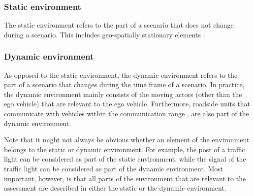 
\subsubsection{Static environment}
\label{sec:static environment}
The static environment refers to the part of a scenario that does not change during a scenario. This includes geo-spatially stationary elements \cite{ulbrich2015}. 

\subsubsection{Dynamic environment}
\label{sec:dynamic environment}
As opposed to the static environment, the dynamic environment refers to the part of a scenario that changes during the time frame of a scenario. 
In practice, the dynamic environment mainly consists of the moving actors (other than the ego vehicle) that are relevant to the ego vehicle. 
Furthermore, roadside units that communicate with vehicles within the communication range \cite{alsultan2014comprehensive}, are also part of the dynamic environment.

Note that it might not always be obvious whether an element of the environment belongs to the static or dynamic environment. For example, the post of a traffic light can be considered as part of the static environment, while the signal of the traffic light can be considered as part of the dynamic environment. Most important, however, is that all parts of the environment that are relevant to the assessment are described in either the static or the dynamic environment.

